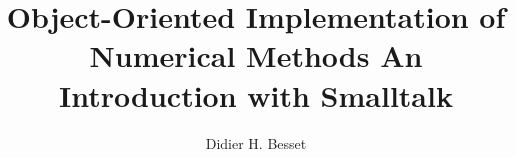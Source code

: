 \documentclass[twoside]{book}
\begin{document}
\title{Object-Oriented Implementation of \linebreak Numerical Methods\linebreak
 An Introduction with Smalltalk}
\author{Didier H. Besset}
\maketitle {}
{\parskip 0pt \tableofcontents \listoffigures \listoftables
} \cleardoublepage{}








\appendix


% 




\end{document}
